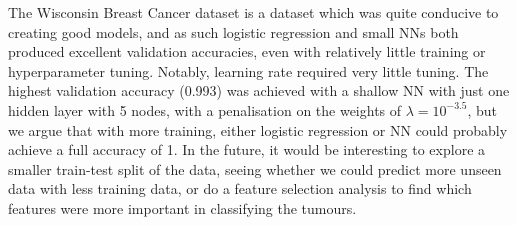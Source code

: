The Wisconsin Breast Cancer dataset is a dataset which was quite conducive to creating good models, and as such logistic regression and small NNs both produced excellent validation accuracies, even with relatively little training or hyperparameter tuning. Notably, learning rate required very little tuning. The highest validation accuracy (0.993) was achieved with a shallow NN with just one hidden layer with 5 nodes, with a penalisation on the weights of $\lambda=10^{-3.5}$, but we argue that with more training, either logistic regression or NN could probably achieve a full accuracy of 1. In the future, it would be interesting to explore a smaller train-test split of the data, seeing whether we could predict more unseen data with less training data, or do a feature selection analysis to find which features were more important in classifying the tumours.